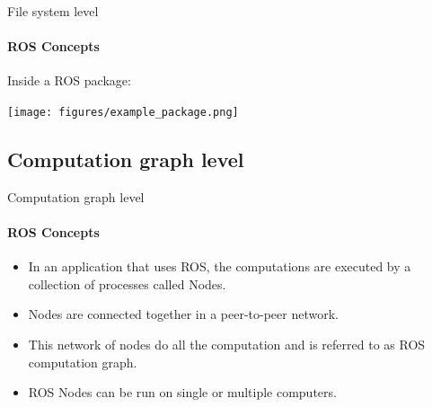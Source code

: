 \documentclass{beamer}
\begin{document}
\begin{frame}{File system level}
    \framesubtitle{ROS Concepts}
Inside a ROS package:

\vspace{0.5cm}
\centering
\texttt{[image: figures/example\_package.png]}
\end{frame}

    
\subsection{Computation graph level}

\begin{frame}{Computation graph level}
    \framesubtitle{ROS Concepts}
    \begin{itemize}
        \item In an application that uses ROS, the computations are executed by a collection of processes called Nodes.
        \item Nodes are connected together in a peer-to-peer network.
        \item This network of nodes do all the computation and is referred to as ROS computation graph.
        \item ROS Nodes can be run on single or multiple computers.
    \end{itemize}
\end{frame}
\end{document}
